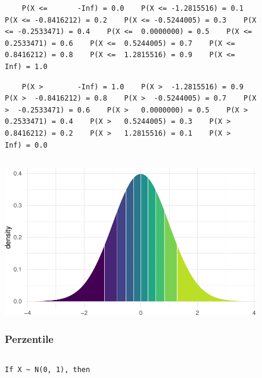 \documentclass[
  letterpaper,
  DIV=11,
  numbers=noendperiod]{scrartcl}
\theoremstyle{definition}
\theoremstyle{definition}
\theoremstyle{definition}
\theoremstyle{remark}
\begin{document}
\begin{figure}
{\begin{verbatim}
    P(X <=       -Inf) = 0.0    P(X <= -1.2815516) = 0.1    P(X <= -0.8416212) = 0.2    P(X <= -0.5244005) = 0.3    P(X <= -0.2533471) = 0.4    P(X <=  0.0000000) = 0.5    P(X <=  0.2533471) = 0.6    P(X <=  0.5244005) = 0.7    P(X <=  0.8416212) = 0.8    P(X <=  1.2815516) = 0.9    P(X <=        Inf) = 1.0
\end{verbatim}

\begin{verbatim}
    P(X >        -Inf) = 1.0    P(X >  -1.2815516) = 0.9    P(X >  -0.8416212) = 0.8    P(X >  -0.5244005) = 0.7    P(X >  -0.2533471) = 0.6    P(X >   0.0000000) = 0.5    P(X >   0.2533471) = 0.4    P(X >   0.5244005) = 0.3    P(X >   0.8416212) = 0.2    P(X >   1.2815516) = 0.1    P(X >         Inf) = 0.0
\end{verbatim}

\begin{verbatim}
\end{verbatim}

\includegraphics{050-zusammenfassen_files/figure-pdf/unnamed-chunk-18-1.pdf}

\subsubsection{Perzentile}

\begin{verbatim}
\end{verbatim}

\begin{verbatim}
If X ~ N(0, 1), then 
\end{verbatim}

}
\end{figure}
\end{document}
